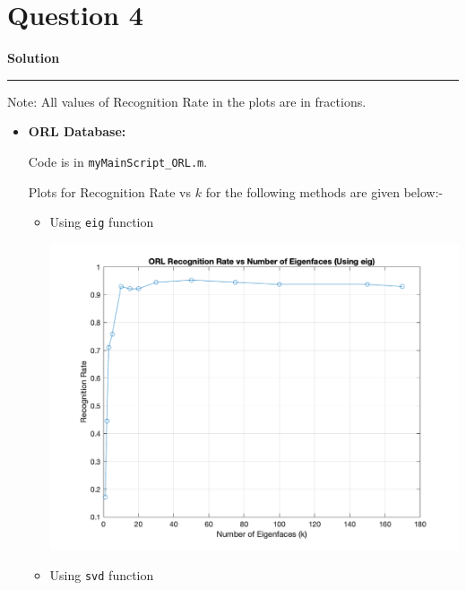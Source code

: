 \documentclass[a4paper,14pt]{article}
\title{\cooltitle{CS663 Assignment-4}}
\author{{\bf Saksham Rathi, Kavya Gupta, Shravan Srinivasa Raghavan} \\
\small Department of Computer Science, \\
Indian Institute of Technology Bombay \\}
\date{}
\newenvironment{solution}[2][]{%
    \begin{mdframed}[linecolor=blue!70!black, linewidth=2pt, roundcorner=10pt, backgroundcolor=yellow!10!white, skipabove=12pt, skipbelow=12pt]%
        \textbf{\large #2}
        \par\noindent\rule{\textwidth}{0.4pt}
}{
    \end{mdframed}
}
\begin{document}
\maketitle

\section*{Question 4}

\begin{solution}{Solution}
	Note: All values of Recognition Rate in the plots are in fractions.
	\begin{itemize}
		\item \textbf{ORL Database:}

		Code is in \texttt{myMainScript\_ORL.m}.

		Plots for Recognition Rate vs $k$ for the following methods are given below:-

		\begin{itemize}
			\item Using \texttt{eig} function
			
			\begin{center}
				\includegraphics[scale=0.4]{../images/ORL_eig.png}
			\end{center}

			\item Using \texttt{svd} function
			

\end{itemize}
\end{itemize}
\end{solution}
\end{document}
